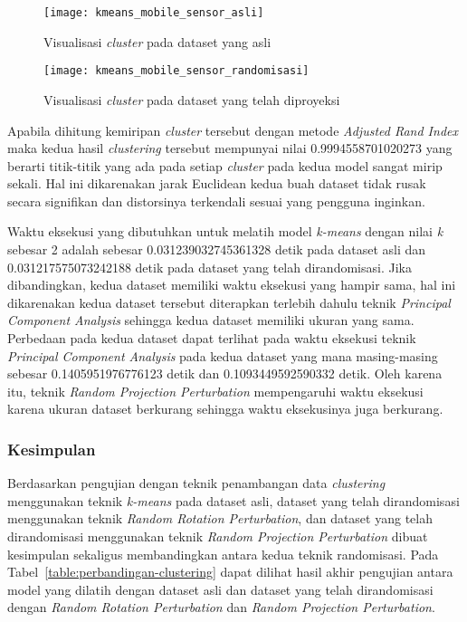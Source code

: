 \begin{figure}
	\centering
	\texttt{[image: kmeans\_mobile\_sensor\_asli]}
	\caption{Visualisasi \textit{cluster} pada dataset yang asli}
	\label{fig:kmeans_mobile_sensor_asli}
\end{figure}

\begin{figure}
	\centering
	\texttt{[image: kmeans\_mobile\_sensor\_randomisasi]}
	\caption{Visualisasi \textit{cluster} pada dataset yang telah diproyeksi}
	\label{fig:kmeans_mobile_sensor_randomisasi}
\end{figure}
	
Apabila dihitung kemiripan \textit{cluster} tersebut dengan metode \textit{Adjusted Rand Index} maka kedua hasil \textit{clustering} tersebut mempunyai nilai 0.9994558701020273 yang berarti titik-titik yang ada pada setiap \textit{cluster} pada kedua model sangat mirip sekali. Hal ini dikarenakan jarak Euclidean kedua buah dataset tidak rusak secara signifikan dan distorsinya terkendali sesuai yang pengguna inginkan.

Waktu eksekusi yang dibutuhkan untuk melatih model \textit{k-means} dengan nilai \textit{k} sebesar 2 adalah sebesar 0.031239032745361328 detik pada dataset asli dan 0.031217575073242188 detik pada dataset yang telah dirandomisasi. Jika dibandingkan, kedua dataset memiliki waktu eksekusi yang hampir sama, hal ini dikarenakan kedua dataset tersebut diterapkan terlebih dahulu teknik \textit{Principal Component Analysis} sehingga kedua dataset memiliki ukuran yang sama. Perbedaan pada kedua dataset dapat terlihat pada waktu eksekusi teknik \textit{Principal Component Analysis} pada kedua dataset yang mana masing-masing sebesar 0.1405951976776123 detik dan 0.1093449592590332 detik. Oleh karena itu, teknik \textit{Random Projection Perturbation} mempengaruhi waktu eksekusi karena ukuran dataset berkurang sehingga waktu eksekusinya juga berkurang.

\subsubsection{Kesimpulan}
\label{subsubsec:pengujian-clustering-kesimpulan}

Berdasarkan pengujian dengan teknik penambangan data \textit{clustering} menggunakan teknik \textit{k-means} pada dataset asli, dataset yang telah dirandomisasi menggunakan teknik \textit{Random Rotation Perturbation}, dan dataset yang telah dirandomisasi menggunakan teknik \textit{Random Projection Perturbation} dibuat kesimpulan sekaligus membandingkan antara kedua teknik randomisasi. Pada Tabel~\ref{table:perbandingan-clustering} dapat dilihat hasil akhir pengujian antara model yang dilatih dengan dataset asli dan dataset yang telah dirandomisasi dengan \textit{Random Rotation Perturbation} dan \textit{Random Projection Perturbation}.

